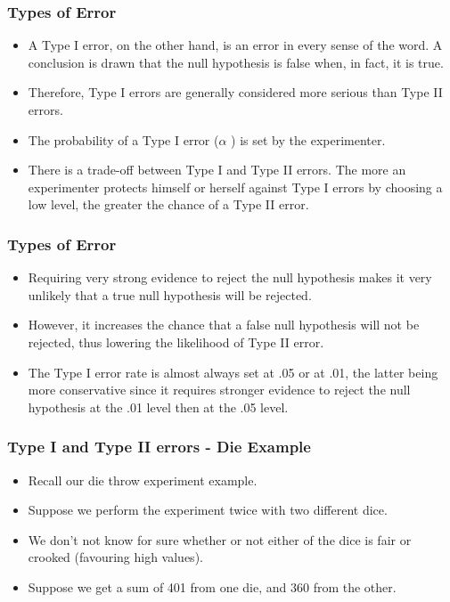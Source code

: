 \begin{frame}
\frametitle{Types of Error}
\large
\begin{itemize}
\item
A Type I error, on the other hand, is an error in every sense of the word. A conclusion is drawn that the null hypothesis is false when, in fact, it is true. \item Therefore, Type I errors are generally considered more serious than Type II errors.
\item
The probability of a Type I error ($\alpha$ ) is set by the experimenter. \item There is a trade-off between Type I and Type II errors. The more an experimenter protects himself or herself against Type I errors by choosing a low level, the greater the chance of a Type II error.
\end{itemize}
\end{frame}
\begin{frame}
\frametitle{Types of Error}
\large
\begin{itemize}
\item
Requiring very strong evidence to reject the null hypothesis makes it very unlikely that a true null hypothesis will be rejected. \item However, it increases the chance that a false null hypothesis will not be rejected, thus lowering the likelihood of Type II error.
\item
The Type I error rate is almost always set at .05 or at .01, the latter being more conservative since it requires stronger evidence to reject the null hypothesis at the .01 level then at the .05 level.
\end{itemize}
\end{frame}



\begin{frame}
\frametitle{Type I and Type II errors - Die Example}
\begin{itemize}
\item Recall our die throw experiment example.
\item Suppose we perform the experiment twice with two different dice.
\item We don't not know for sure whether or not either of the dice is fair or crooked (favouring high values).
\item Suppose we get a sum of 401 from one die, and 360 from the other.
\end{itemize}
\end{frame}

